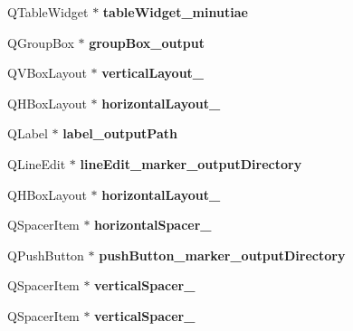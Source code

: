 \begin{DoxyCompactItemize}
Q\+Table\+Widget $\ast$ {\bfseries table\+Widget\+\_\+minutiae}
\item 
\mbox{\label{class_ui___main_window_a5341d454d75ecc6e79f27391bdc035d1}} 
Q\+Group\+Box $\ast$ {\bfseries group\+Box\+\_\+output}
\item 
\mbox{\label{class_ui___main_window_ab69a0ed5b8ea1148c5dda9b89cdfbba4}} 
Q\+V\+Box\+Layout $\ast$ {\bfseries vertical\+Layout\+\_}
\item 
\mbox{\label{class_ui___main_window_a14c9d4842c3e97e16e7873ef0aecdb1e}} 
Q\+H\+Box\+Layout $\ast$ {\bfseries horizontal\+Layout\+\_}
\item 
\mbox{\label{class_ui___main_window_a8200b551b6527b19358f7bc673d6bd34}} 
Q\+Label $\ast$ {\bfseries label\+\_\+output\+Path}
\item 
\mbox{\label{class_ui___main_window_ae03925b14d86287f23dfae4df71d5619}} 
Q\+Line\+Edit $\ast$ {\bfseries line\+Edit\+\_\+marker\+\_\+output\+Directory}
\item 
\mbox{\label{class_ui___main_window_ae183387a7d233b437a637b403ba39ffd}} 
Q\+H\+Box\+Layout $\ast$ {\bfseries horizontal\+Layout\+\_}
\item 
\mbox{\label{class_ui___main_window_a9a022556cf8ce3fa47e51d79cb222ab0}} 
Q\+Spacer\+Item $\ast$ {\bfseries horizontal\+Spacer\+\_}
\item 
\mbox{\label{class_ui___main_window_a3e58d254cde43574df12fe7f32dc7f87}} 
Q\+Push\+Button $\ast$ {\bfseries push\+Button\+\_\+marker\+\_\+output\+Directory}
\item 
\mbox{\label{class_ui___main_window_a2e4c63737c14e5af736837df590fe004}} 
Q\+Spacer\+Item $\ast$ {\bfseries vertical\+Spacer\+\_}
\item 
\mbox{\label{class_ui___main_window_a298e82ba0cc2500cd61f393f493e4529}} 
Q\+Spacer\+Item $\ast$ {\bfseries vertical\+Spacer\+\_}

\end{DoxyCompactItemize}
